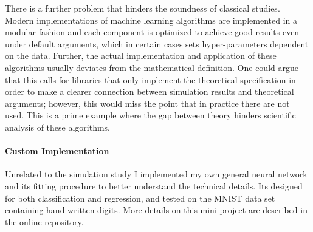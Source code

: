 There is a further problem that hinders the soundness of classical studies. Modern
implementations of machine learning algorithms are implemented in a modular fashion and
each component is optimized to achieve good results even under default arguments, which
in certain cases sets hyper-parameters dependent on the data. Further, the actual
implementation and application of these algorithms usually deviates from the
mathematical definition. One could argue that this calls for libraries that only
implement the theoretical specification in order to make a clearer connection between
simulation results and theoretical arguments; however, this would miss the point that in
practice there are not used. This is a prime example where the gap between theory
hinders scientific analysis of these algorithms.

\paragraph{Custom Implementation}

Unrelated to the simulation study I implemented my own general neural network and its
fitting procedure to better understand the technical details. Its designed for both
classification and regression, and tested on the MNIST data set containing hand-written
digits. More details on this mini-project are described in the online repository.
